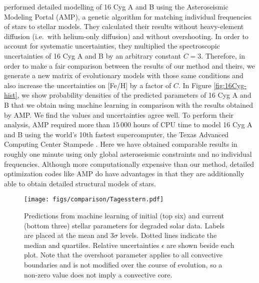 \documentclass[twocolumn,twocolappendix]{aastex6}
\begin{document}
\citet{2015ApJ...811L..37M} performed detailed modelling of 16 Cyg A and B using the Asteroseismic Modeling Portal (AMP), a genetic algorithm for matching individual frequencies of stars to stellar models. They calculated their results without heavy-element diffusion (i.e.\ with helium-only diffusion) and without overshooting. In order to account for systematic uncertainties, they multiplied the spectroscopic uncertainties of 16 Cyg A and B by an arbitrary constant $C=3$. Therefore, in order to make a fair comparison between the results of our method and theirs, we generate a new matrix of evolutionary models with those same conditions and also increase the uncertainties on [Fe/H] by a factor of $C$. In Figure \ref{fig:16Cyg-hist}, we show probability densities of the predicted parameters of 16 Cyg A and B that we obtain using machine learning in comparison with the results obtained by AMP. We find the values and uncertainties agree well. To perform their analysis, AMP required more than $15\,000$ hours of CPU time to model 16 Cyg A and B using the world's 10th fastest supercomputer, the Texas Advanced Computing Center Stampede \citep{TOP500}. Here we have obtained comparable results in roughly one minute using only global asteroseismic constraints and no individual frequencies. Although more computationally expensive than our method, detailed optimization codes like AMP do have advantages in that they are additionally able to obtain detailed structural models of stars. %

\begin{figure*}
    \centering
    \texttt{[image: figs/comparison/Tagesstern.pdf]}
    \caption{Predictions from machine learning of initial (top six) and current (bottom three) stellar parameters for degraded solar data. Labels are placed at the mean and 3$\sigma$ levels. Dotted lines indicate the median and quartiles. Relative uncertainties $\epsilon$ are shown beside each plot. Note that the overshoot parameter applies to all convective boundaries and is not modified over the course of evolution, so a non-zero value does not imply a convective core. %
    \label{fig:corner} } 
\end{figure*}
\end{document}
